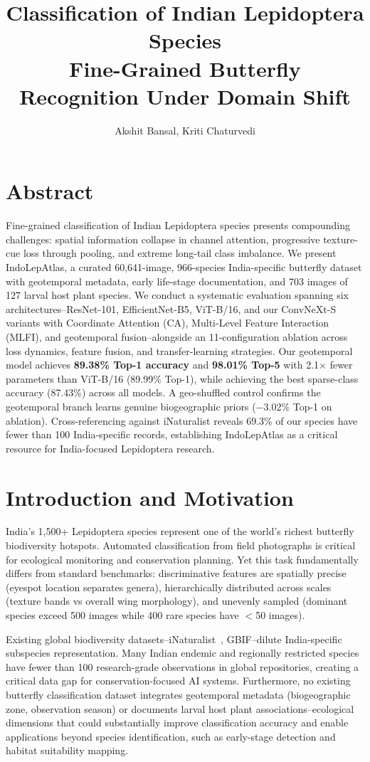 \documentclass[11pt]{article}
\title{\textbf{Classification of Indian Lepidoptera Species}\\
\Large Fine-Grained Butterfly Recognition Under Domain Shift}
\author{
  Akshit Bansal, Kriti Chaturvedi
}
\date{}
\begin{document}
\maketitle

\section{Abstract}
Fine-grained classification of Indian Lepidoptera species presents compounding challenges: spatial information collapse in channel attention, progressive texture-cue loss through pooling, and extreme long-tail class imbalance. We present IndoLepAtlas, a curated 60,641-image, 966-species India-specific butterfly dataset with geotemporal metadata, early life-stage documentation, and 703 images of 127 larval host plant species. We conduct a systematic evaluation spanning six architectures--ResNet-101, EfficientNet-B5, ViT-B/16, and our ConvNeXt-S variants with Coordinate Attention (CA), Multi-Level Feature Interaction (MLFI), and geotemporal fusion--alongside an 11-configuration ablation across loss dynamics, feature fusion, and transfer-learning strategies. Our geotemporal model achieves \textbf{89.38\% Top-1 accuracy} and \textbf{98.01\% Top-5} with 2.1$\times$ fewer parameters than ViT-B/16 (89.99\% Top-1), while achieving the best sparse-class accuracy (87.43\%) across all models. A geo-shuffled control confirms the geotemporal branch learns genuine biogeographic priors ($-$3.02\% Top-1 on ablation). Cross-referencing against iNaturalist reveals 69.3\% of our species have fewer than 100 India-specific records, establishing IndoLepAtlas as a critical resource for India-focused Lepidoptera research.

\section{Introduction and Motivation}

India's 1,500+ Lepidoptera species represent one of the world's richest butterfly biodiversity hotspots. Automated classification from field photographs is critical for ecological monitoring and conservation planning. Yet this task fundamentally differs from standard benchmarks: discriminative features are spatially precise (eyespot location separates genera), hierarchically distributed across scales (texture bands vs overall wing morphology), and unevenly sampled (dominant species exceed 500 images while 400 rare species have $<$50 images).

Existing global biodiversity datasets--iNaturalist~\cite{vanhorn2018inaturalist}, GBIF--dilute India-specific subspecies representation. Many Indian endemic and regionally restricted species have fewer than 100 research-grade observations in global repositories, creating a critical data gap for conservation-focused AI systems. Furthermore, no existing butterfly classification dataset integrates geotemporal metadata (biogeographic zone, observation season) or documents larval host plant associations--ecological dimensions that could substantially improve classification accuracy and enable applications beyond species identification, such as early-stage detection and habitat suitability mapping.
\end{document}

